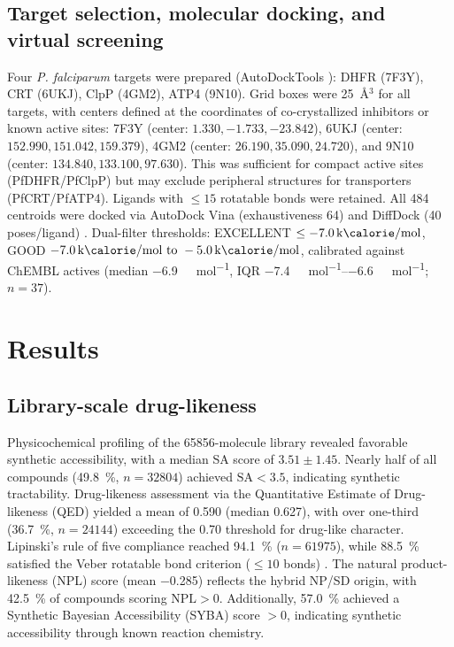 \documentclass[journal=jcisd8,manuscript=article]{achemso}
\begin{document}
\subsection{Target selection, molecular docking, and virtual screening}

Four \emph{P. falciparum} targets were prepared (AutoDockTools \cite{Eberhardt2021}): DHFR (7F3Y), CRT (6UKJ), ClpP (4GM2), ATP4 (9N10). Grid boxes were \qty{25}{\angstrom}$^3$ for all targets, with centers defined at the coordinates of co-crystallized inhibitors or known active sites: 7F3Y (center: $1.330, -1.733, -23.842$), 6UKJ (center: $152.990, 151.042, 159.379$), 4GM2 (center: $26.190, 35.090, 24.720$), and 9N10 (center: $134.840, 133.100, 97.630$). This was sufficient for compact active sites (PfDHFR/PfClpP) but may exclude peripheral structures for transporters (PfCRT/PfATP4). Ligands with $\leq \num{15}$ rotatable bonds were retained. All \num{484} centroids were docked via AutoDock Vina (exhaustiveness \num{64}) and DiffDock (\num{40} poses/ligand) \cite{Corso2023}. Dual-filter thresholds: EXCELLENT $\leq \qty{-7.0}{\kilo\calorie\per\mole}$, GOOD $\qtyrange{-7.0}{-5.0}{\kilo\calorie\per\mole}$, calibrated against ChEMBL actives (median \qty{-6.9}{\kilo\calorie\per\mole}, IQR \qtyrange{-7.4}{-6.6}{\kilo\calorie\per\mole}; $n=37$).

\section{Results}
\label{sec:results}

\subsection{Library-scale drug-likeness}
\label{sec:results-library}

Physicochemical profiling of the \num{65856}-molecule library revealed favorable synthetic accessibility, with a median SA score of $\num{3.51} \pm \num{1.45}$. Nearly half of all compounds (\qty{49.8}{\percent}, $n = \num{32804}$) achieved $\text{SA} < \num{3.5}$, indicating synthetic tractability. Drug-likeness assessment via the Quantitative Estimate of Drug-likeness (QED) yielded a mean of \num{0.590} (median \num{0.627}), with over one-third (\qty{36.7}{\percent}, $n = \num{24144}$) exceeding the \num{0.70} threshold for drug-like character. Lipinski's rule of five compliance reached \qty{94.1}{\percent} ($n = \num{61975}$), while \qty{88.5}{\percent} satisfied the Veber rotatable bond criterion ($\leq\num{10}$ bonds) \cite{Lipinski2004, Veber2002, Bayliss2016, Hann2004}. The natural product-likeness (NPL) score (mean \num{-0.285}) reflects the hybrid NP/SD origin, with \qty{42.5}{\percent} of compounds scoring $\text{NPL} > \num{0}$. Additionally, \qty{57.0}{\percent} achieved a Synthetic Bayesian Accessibility (SYBA) score $> \num{0}$, indicating synthetic accessibility through known reaction chemistry.
\end{document}
